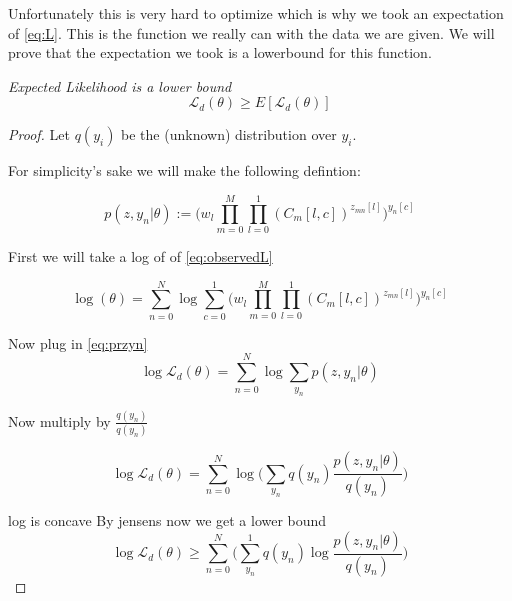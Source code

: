 Unfortunately this is very hard to optimize which is why we took an expectation of \eqref{eq:L}. This is the function we really can with the data we are given. We will prove that the expectation we took is a lowerbound for this function.
\begin{theorem}
\emph{Expected Likelihood is a lower bound}
\label{EMlower}
$$ \mathcal{L}_{d}(\theta) \geq E[\mathcal{L}_{d}(\theta)]$$
\begin{proof}

Let $q(y_{i})$ be the (unknown) distribution over $y_{i}$.

For simplicity's sake we will make the following defintion:

\begin{equation} \label{eq:przyn}
p(z,y_{n}|\theta) :=
\Big (w_{l} \displaystyle\prod\limits_{m=0}^{M} \displaystyle\prod\limits_{l=0}^{1} (C_{m}[l,c])^{z_{mn}[l]} \Big )^{y_{n}[c]}
\end{equation}


First we will take a log of of \eqref{eq:observedL}

\begin{equation}
\log (\theta) = \displaystyle\sum\limits_{n=0}^{N} \log
\displaystyle\sum\limits_{c=0}^{1}
\Big (w_{l} \displaystyle\prod\limits_{m=0}^{M} \displaystyle\prod\limits_{l=0}^{1} (C_{m}[l,c])^{z_{mn}[l]} \Big )^{y_{n}[c]}
\end{equation}

Now plug in \eqref{eq:przyn}
\begin{equation} \label{eq:lll}
\log \mathcal{L}_{d}(\theta) = \displaystyle\sum\limits_{n=0}^{N} \log \displaystyle\sum\limits_{y_{n}} p(z,y_{n} | \theta)
\end{equation}

Now multiply by $\frac{q(y_{n})}{q(y_{n})}$

\begin{equation}
\log \mathcal{L}_{d}(\theta) = \displaystyle\sum\limits_{n=0}^{N} \log \Big ( \displaystyle\sum\limits_{y_{n}} q(y_{n})\frac{p(z,y_{n} | \theta)}{q(y_{n})} \Big )
\end{equation}

log is concave By jensens now we get a lower bound
\begin{equation}\label{eq:jensens}
\log \mathcal{L}_{d}(\theta) \geq
\displaystyle\sum\limits_{n=0}^{N} \Big ( \displaystyle\sum\limits_{y_{n}}^{1} q(y_{n})\log \frac{p(z,y_{n} | \theta)}{q(y_{n})} \Big )
\end{equation}


\end{proof}
\end{theorem}
